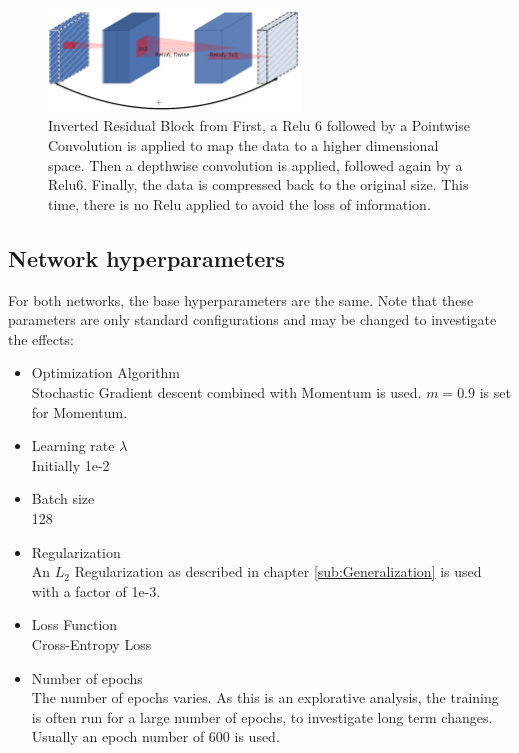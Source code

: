 \begin{figure}[H]
    \centering
    \includegraphics[width=0.6\textwidth]{images/Inverted_Residual.png}
    \caption{Inverted Residual Block from \cite[Page 3]{sandler2018mobilenetv2}\newline 
    First, a Relu 6 followed by a Pointwise Convolution is applied to map the
     data to a higher dimensional space. Then a depthwise convolution is
     applied, followed again by a Relu6. Finally, the data is compressed back to
     the original size. This time, there is no Relu applied to avoid the loss of
     information.}
     \label{fig:InvRes}
\end{figure}


\subsection{Network hyperparameters}\label{sub:Hyperparameters}
For both networks, the base hyperparameters are the same. Note that these
parameters are only standard configurations and may be changed to investigate
the effects:
\begin{itemize}
    \item Optimization Algorithm \\Stochastic Gradient descent combined with
    Momentum is used. $m=0.9$ is set for Momentum.
    \item Learning rate $\lambda$ \\Initially 1e-2
    \item Batch size \\128
    \item Regularization \\An $L_2$ Regularization as described in chapter
    \ref{sub:Generalization} is used with a factor of 1e-3.
    \item Loss Function \\Cross-Entropy Loss
    \item Number of epochs \\The number of epochs varies. As this is an
    explorative analysis, the training is often run for a large number of
    epochs, to investigate long term changes. Usually an epoch number of 600 is
    used.
\end{itemize}

